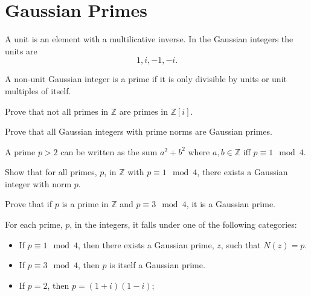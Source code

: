 \section{Gaussian Primes}

\begin{definition}[Units]
  A unit is an element with a multilicative inverse. In the Gaussian integers the units are
  \[
    1, i, -1, -i.
  \]
  
\end{definition}

\begin{definition}
  A non-unit Gaussian integer is a prime if it is only divisible by units or unit multiples of itself.
\end{definition}


\begin{problem}
  Prove that not all primes in \(\mathbb{Z} \) are primes in \(\mathbb{Z} \left[i\right]\).
\end{problem}

\begin{problem}
  Prove that all Gaussian integers with prime norms are Gaussian primes.
\end{problem}

\begin{theorem}
  A prime \(p > 2\) can be written as the sum \(a^2 + b^2\) where \(a, b \in \mathbb{Z} \) iff \(p \equiv 1 \mod 4\).
\end{theorem}

\begin{problem}
  Show that for all primes, \(p\), in \(\mathbb{Z} \) with \(p \equiv 1 \mod 4\), there exists a Gaussian integer with norm \(p\).
\end{problem}


\begin{problem}
  Prove that if \(p\) is a prime in \(\mathbb{Z} \) and \(p \equiv 3 \mod 4\), it is a Gaussian prime.
\end{problem}

\begin{corollary}
  For each prime, \(p \), in the integers, it falls under one of the following categories: 
  \begin{itemize}
    \item If \(p \equiv 1 \mod 4\), then there exists a Gaussian prime, \(z\), such that \(N(z) = p\).
    \item If \(p \equiv 3 \mod 4\), then \(p\) is itself a Gaussian prime.
    \item If \(p = 2\), then \(p = (1+i)(1-i) \);
  \end{itemize}
\end{corollary}

